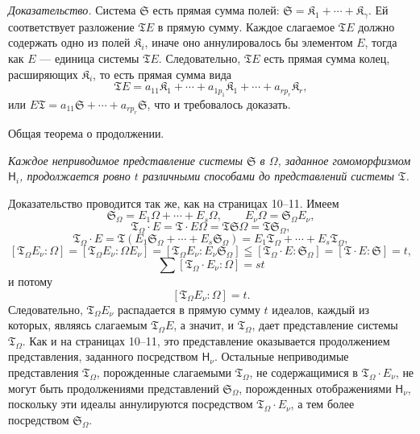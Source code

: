 \documentclass[11pt]{article}
\begin{document}
\emph{Доказательство.} Система \(\mathfrak S\) есть прямая сумма полей: \(\mathfrak S=\mathfrak K_1+\cdots+\mathfrak K_\gamma\). Ей соответствует разложение \(\mathfrak T E\) в прямую сумму. Каждое слагаемое \(\mathfrak T E\) должно содержать одно из полей \(\mathfrak K_i\), иначе оно аннулировалось бы элементом \(E\), тогда как \(E\) --- единица системы \(\mathfrak T E\). Следовательно, \(\mathfrak T E\) есть прямая сумма колец, расширяющих \(\mathfrak K_i\), то есть прямая сумма вида
\[
\mathfrak T E=a_{11}\mathfrak K_1+\cdots+a_{1p_1}\mathfrak K_1+\cdots+a_{rp_r}\mathfrak K_r,
\]
или \(E\mathfrak T=a_{11}\mathfrak S+\cdots+a_{rp_r}\mathfrak S\), что и требовалось доказать.

\begin{center}
Общая теорема о продолжении.
\end{center}

\emph{Каждое неприводимое представление системы \(\mathfrak S\) в \(\Omega\), заданное гомоморфизмом \(\mathsf{H}_i\), продолжается ровно \(t\) различными способами до представлений системы \(\mathfrak T\).}

Доказательство проводится так же, как на страницах 10--11. Имеем
\[
\mathfrak S_\Omega=E_1\Omega+\cdots+E_s\Omega,\qquad
E_\nu\Omega=\mathfrak S_\Omega E_\nu,
\]
\[
\mathfrak T_\Omega\cdot E=\mathfrak T\cdot E\Omega
=\mathfrak T\mathfrak S\Omega=\mathfrak T\mathfrak S_\Omega,
\]
\[
\mathfrak T_\Omega\cdot E
=\mathfrak T(E_1\mathfrak S_\Omega+\cdots+E_s\mathfrak S_\Omega)
=E_1\mathfrak T_\Omega+\cdots+E_s\mathfrak T_\Omega,
\]
\[
[\mathfrak T_\Omega E_\nu:\Omega]
=[\mathfrak T_\Omega E_\nu:\Omega E_\nu]
=[\mathfrak T_\Omega E_\nu:E_\nu\mathfrak S_\Omega]
\leqq[\mathfrak T_\Omega\cdot E:\mathfrak S_\Omega]
=[\mathfrak T\cdot E:\mathfrak S]=t,
\]
\[
\sum[\mathfrak T_\Omega\cdot E_\nu:\Omega]=st
\]
и потому
\[
[\mathfrak T_\Omega E_\nu:\Omega]=t.
\]
Следовательно, \(\mathfrak T_\Omega E_\nu\) распадается в прямую сумму \(t\) идеалов, каждый из которых, являясь слагаемым \(\mathfrak T_\Omega E\), а значит, и \(\mathfrak T_\Omega\), дает представление системы \(\mathfrak T_\Omega\). Как и на страницах 10--11, это представление оказывается продолжением представления, заданного посредством \(\mathsf{H}_\nu\). Остальные неприводимые представления \(\mathfrak T_\Omega\), порожденные слагаемыми \(\mathfrak T_\Omega\), не содержащимися в \(\mathfrak T_\Omega\cdot E_\nu\), не могут быть продолжениями представлений \(\mathfrak S_\Omega\), порожденных отображениями \(\mathsf{H}_\nu\), поскольку эти идеалы аннулируются посредством \(\mathfrak T_\Omega\cdot E_\nu\), а тем более посредством \(\mathfrak S_\Omega\).
\end{document}
